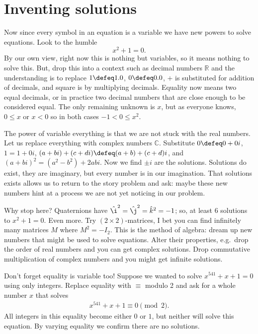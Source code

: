 \section{Inventing solutions}
Now since every symbol in an equation is a variable we have new powers 
to solve equations.  Look to the humble 
\[
    x^2+1=0.
\]
By our own view, right now this is nothing but variables, so it means nothing to
solve this.  But, drop this into a context such as decimal numbers $\mathbb{R}$
and the understanding is to replace $1\defeq 1.0$, $0\defeq 0.0$, $+$ is
substituted for addition of decimals, and square is by multiplying decimals.
Equality now means two equal decimals, or in practice two decimal numbers that
are close enough to be considered equal.  The only remaining unknown is $x$, but
as everyone knows, $0\leq x$ or $x<0$ so in both cases $-1<0\leq x^2$.

The power of variable everything is that we are not stuck with the real numbers.
Let us replace everything with complex numbers $\mathbb{C}$. Substitute $0\defeq
0+0i$, $1=1+0i$, $(a+bi)+(c+di)\defeq (a+b)+(c+d)i$, and
$(a+bi)^2=(a^2-b^2)+2abi$.  Now we find $\pm i$ are the solutions. Solutions do
exist, they are imaginary, but every number is in our imagination. 
That solutions exists allows us to return to the story problem and ask:
maybe these new numbers hint at a process we are not yet noticing in our 
problem.

Why stop here? Quaternions have $\hat{\i}^2=\hat{\j}^2=\hat{k}^2=-1$;
so, at least 6 solutions to $x^2+1=0$.  Even more.  Try $(2\times 2)$-matrices, I
bet you can find infinitely many matrices $M$ where $M^2=-I_2$.  This is the method
of algebra: dream up new numbers that might be used to solve equations.  Alter
their properties, e.g.\ drop the order of real numbers and you can get complex
solutions.  Drop commutative multiplication of complex numbers and you might get
infinite solutions.  

Don't forget equality is variable too!  Suppose we wanted to solve $x^{541}+x+1=0$
using only integers.  Replace equality 
with $\equiv$ modulo 2 and ask for a whole number $x$ that solves
\begin{align*}
    x^{541}+x+1\equiv 0\pmod{2}.
\end{align*}
All integers in this equality become either $0$ or $1$, but neither will solve 
this equation.  By varying equality we confirm there are no solutions.

